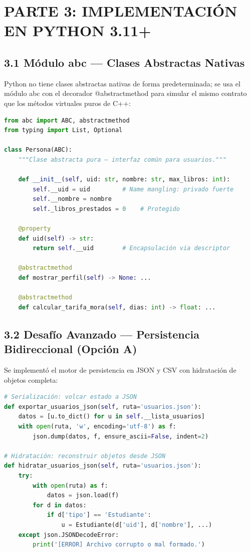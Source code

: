 \documentclass[12pt,a4paper]{article}
\begin{document}
\section{PARTE 3: IMPLEMENTACIÓN EN PYTHON 3.11+}

\subsection{3.1 Módulo abc — Clases Abstractas Nativas}
Python no tiene clases abstractas nativas de forma predeterminada; se usa el módulo abc con el decorador @abstractmethod para simular el mismo contrato que los métodos virtuales puros de C++:

\begin{lstlisting}[language=Python]
from abc import ABC, abstractmethod
from typing import List, Optional

class Persona(ABC):
    """Clase abstracta pura — interfaz común para usuarios."""

    def __init__(self, uid: str, nombre: str, max_libros: int):
        self.__uid = uid         # Name mangling: privado fuerte
        self.__nombre = nombre
        self._libros_prestados = 0    # Protegido

    @property
    def uid(self) -> str:
        return self.__uid        # Encapsulación via descriptor

    @abstractmethod
    def mostrar_perfil(self) -> None: ...

    @abstractmethod
    def calcular_tarifa_mora(self, dias: int) -> float: ...
\end{lstlisting}

\subsection{3.2 Desafío Avanzado — Persistencia Bidireccional (Opción A)}
Se implementó el motor de persistencia en JSON y CSV con hidratación de objetos completa:

\begin{lstlisting}[language=Python]
# Serialización: volcar estado a JSON
def exportar_usuarios_json(self, ruta='usuarios.json'):
    datos = [u.to_dict() for u in self.__lista_usuarios]
    with open(ruta, 'w', encoding='utf-8') as f:
        json.dump(datos, f, ensure_ascii=False, indent=2)

# Hidratación: reconstruir objetos desde JSON
def hidratar_usuarios_json(self, ruta='usuarios.json'):
    try:
        with open(ruta) as f:
            datos = json.load(f)
        for d in datos:
            if d['tipo'] == 'Estudiante':
                u = Estudiante(d['uid'], d['nombre'], ...)
    except json.JSONDecodeError:
        print('[ERROR] Archivo corrupto o mal formado.')
\end{lstlisting}
\end{document}
